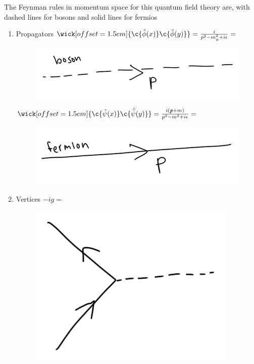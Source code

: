 \noindent The Feynman rules in momentum space for this quantum field theory are, with dashed lines for bosons and solid lines for fermios

\begin{enumerate}
\item Propagators
	\subitem $\wick[offset=1.5em]{\c {\hat{\phi}(x)} \c {\hat{\phi}(y)}} = \frac{i}{p^2 - m_\phi^2 + i \epsilon} = $ \begin{figure}[H]\centering \includegraphics[scale=0.3]{images/bosonprop.png}  \end{figure}
	\subitem $\wick[offset=1.5em]{\c {\hat{\psi}(x)} \c {\hat{\bar{\psi}}(y)}} = \frac{i (\slashed{p} + m)}{p^2 - m^2 + i \epsilon} = $ \begin{figure}[H]\centering \includegraphics[scale=0.3]{images/fermionprop.png}  \end{figure}
\item Vertices
	\subitem $-ig = $ \begin{figure}[H]\centering \includegraphics[scale=0.3]{images/vertex.png}  \end{figure}

\end{enumerate}
